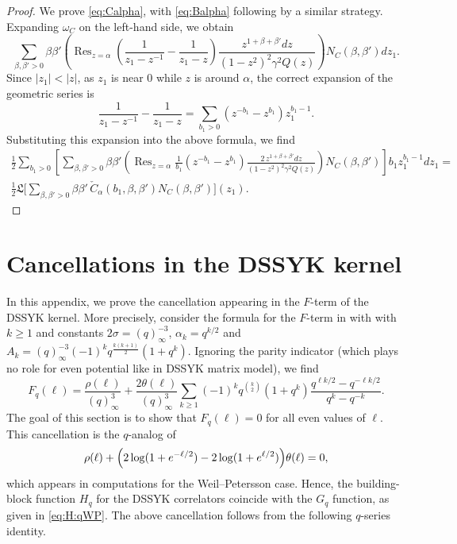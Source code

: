 \documentclass[a4paper,11pt,english]{article}
\theoremstyle{plain}
\theoremstyle{definition}
\theoremstyle{plain}
\DeclareMathOperator*{\Res}{Res}
\begin{document}
\begin{proof}
	We prove \cref{eq:Calpha}, with \cref{eq:Balpha} following by a similar strategy.
	Expanding $\omega_C$ on the left-hand side, we obtain
	\begin{equation}
		\sum_{\beta,\beta' > 0}
			\beta \beta'
			\left(
				\Res_{z = \alpha}
				\left(
					\frac{1}{z_1 - z^{-1}} - \frac{1}{z_1 - z}
				\right)
				\frac{z^{1 + \beta + \beta'} dz}{(1 - z^2)^2 \gamma^2 Q(z)}
			\right)
			N_{C}(\beta,\beta') dz_1.
	\end{equation}
	Since $|z_1| < |z|$, as $z_1$ is near $0$ while $z$ is around $\alpha$, the correct expansion of the geometric series is
	\begin{equation}
		\frac{1}{z_1 - z^{-1}} - \frac{1}{z_1 - z}
		=
		\sum_{b_1 > 0} ( z^{-b_1} - z^{b_1} ) z_1^{b_1-1}.
	\end{equation}
	Substituting this expansion into the above formula, we find
	\begin{multline}
		\frac{1}{2}
		\sum_{b_1>0}
		\left[
			\sum_{\beta,\beta' > 0}
				\beta \beta'
				\left(
					\Res_{z = \alpha}
					\frac{1}{b_1} ( z^{-b_1} - z^{b_1} )
					\frac{2 \, z^{1 + \beta + \beta'} dz}{(1 - z^2)^2 \gamma^2 Q(z)}
				\right)
			N_{C}(\beta,\beta')
		\right]
		b_1 z_1^{b_1 - 1} dz_1
		= \\
		\frac{1}{2}
		\mathfrak{L}\Bigg[
			\sum_{\beta,\beta' > 0} \beta \beta' \, \check{C}_{\alpha}(b_1,\beta,\beta') N_C(\beta,\beta') 
		\Bigg](z_1) .
	\end{multline}
\end{proof}

\section{Cancellations in the DSSYK kernel}
\label{app:cancellation}
In this appendix, we prove the cancellation appearing in the $F$-term of the DSSYK kernel. More precisely, consider the formula for the $F$-term in  with  with $k \ge 1$ and constants $2\sigma = (q)_{\infty}^{-3}$, $\alpha_k = q^{k/2}$ and $A_k = (q)_{\infty}^{-3} (-1)^k q^{\frac{k(k+1)}{2}} (1 + q^k)$. Ignoring the parity indicator (which plays no role for even potential like in DSSYK matrix model), we find
\begin{equation}
	F_q(\ell)
	=
	\frac{\rho(\ell)}{(q)_{\infty}^3}
	+
	\frac{2\theta(\ell)}{(q)_{\infty}^3}
    \sum_{k \ge 1}
		(-1)^k
		q^{\binom{k}{2}} (1 + q^k) \frac{q^{\ell k/2} - q^{-\ell k/2}}{q^k - q^{-k}} .
\end{equation}
The goal of this section is to show that $F_q(\ell) = 0$ for all even values of $\ell$. This cancellation is the $q$-analog of
\begin{equation}
    \rho(\ell) + \Bigl( 2\log(1+e^{-\ell/2}) - 2\log(1+e^{\ell/2}) \Bigr) \theta(\ell) = 0,
\end{equation}
which appears in computations for the Weil--Petersson case. Hence, the building-block function $H_q$ for the DSSYK correlators coincide with the $G_q$ function, as given in \cref{eq:H:qWP}. The above cancellation follows from the following $q$-series identity.
\end{document}
